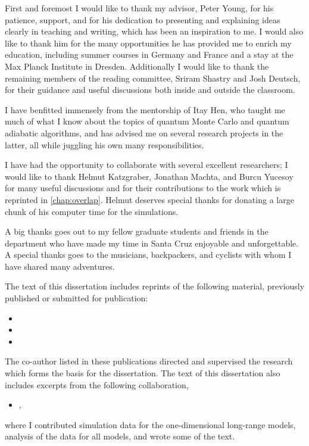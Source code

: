 \begin{acknowledgements}
  \DoubleSpacing
  First and foremost I would like to thank my advisor, Peter Young, for his
  patience, support, and for his dedication to presenting and explaining ideas
  clearly in teaching and writing, which has been an inspiration to me. I would
  also like to thank him for the many opportunities he has provided me to
  enrich my education, including summer courses in Germany and France and a
  stay at the Max Planck Institute in Dresden. Additionally I would like to
  thank the remaining members of the reading committee, Sriram Shastry and Josh
  Deutsch, for their guidance and useful discussions both inside and outside
  the classroom.

  I have benfitted immensely from the mentorship of Itay Hen, who taught me
  much of what I know about the topics of quantum Monte Carlo and quantum
  adiabatic algorithms, and has advised me on several research projects in the
  latter, all while juggling his own many responsibilities.

  I have had the opportunity to collaborate with several excellent researchers;
  I would like to thank Helmut Katzgraber, Jonathan Machta, and Burcu Yucesoy
  for many useful discussions and for their contributions to the work which is
  reprinted in \cref{chap:overlap}. Helmut deserves special thanks for donating
  a large chunk of his computer time for the simulations.

  A big thanks goes out to my fellow graduate students and friends in the
  department who have made my time in Santa Cruz enjoyable and unforgettable. A
  special thanks goes to the musicians, backpackers, and cyclists with whom I
  have shared many adventures.

  The text of this dissertation includes reprints of the following material,
  previously published or submitted for publication:
  \begin{itemize}
    \item{}
    \item{}
    \item{}
  \end{itemize}
  The co-author listed in these publications directed and supervised the
  research which forms the basis for the dissertation. The text of this
  dissertation also includes excerpts from the following collaboration,
  \begin{itemize}
    \item{},
  \end{itemize}
  where I contributed simulation data for the one-dimensional long-range
  models, analysis of the data for all models, and wrote some of the text.
\end{acknowledgements}
